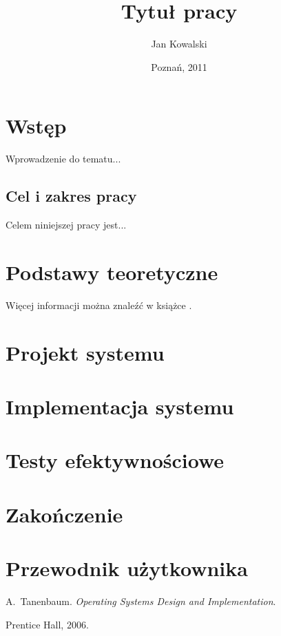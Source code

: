\documentclass[11pt,a4paper,polish,thesis]{dcsbook}
\begin{document}
\author{Jan Kowalski}
\title{Tytuł pracy}
\date{Poznań, 2011}

\maketitle

\frontmatter

\tableofcontents{}

\mainmatter

\chapter{Wstęp}

Wprowadzenie do tematu...

\section*{Cel i zakres pracy}

Celem niniejszej pracy jest...

\chapter{Podstawy teoretyczne}

Więcej informacji można znaleźć w książce \cite{sop}.

\chapter{Projekt systemu}

\chapter{Implementacja systemu}

\chapter{Testy efektywnościowe}

\chapter{Zakończenie}

\appendix

\chapter{Przewodnik użytkownika}

\backmatter

\begin{thebibliography}{1}

A.~Tanenbaum. \emph{Operating Systems Design and Implementation}.

Prentice Hall, 2006.

\end{thebibliography}
\end{document}
